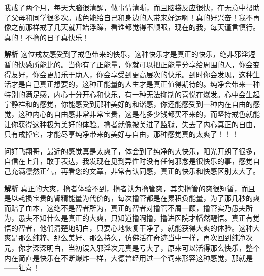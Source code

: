 \begin{case}
    我戒了两个月，每天大脑很清醒，做事情清晰，而且脑袋反应很快，在无意中帮助了父母和同学很多次。戒色能给自己和身边的人带来好运啊！真的好兴奋！我不再像之前那样戒了几天就开始浮躁，看谁都觉得不顺眼，现在的我，每天谨言慎行。真的！不撸的日子真快乐！

    \textbf{解析} 这位戒友感受到了戒色带来的快乐，这种快乐才是真正的快乐，绝非邪淫短暂的快感所能比的。当你有了正能量，你就可以把正能量分享给周围的人，你会变得友好，你会更加乐于助人，你会享受到更高层次的快乐。到时你会发现，这种生活才是自己真正想要的，这种正能量的人生才是真正值得期待的。纯净会带来一种特别的满足感，内心十分开心和快乐，有一种无法抑制的喜悦在爆发。心中会生起宁静祥和的感觉，你能感受到那种美好的和谐感，你还能感受到一种内在自由的感觉，这种内心的自由感非常非常宝贵，这是花多少钱都买不来的，而坚持戒色就能让你获得这种极为美好的体验。撸者就像被关进了监狱，失去了内心真正的自由，只有戒掉它，才能尽享纯净带来的美好与自由，那种感觉真的太爽了！！！
\end{case}

\begin{case}
    问好飞翔哥，最近的感觉真是太爽了，体会到了纯净的大快乐，阳光开朗了很多，自信在上升，敢于表达，我发现在见到异性时没有任何邪念是很快乐的事，感觉自己充满凛然正气，再看您的文章，非常有认同感，真正的快乐和快感区别太大了。

    \textbf{解析} 真正的大爽，撸者体验不到，撸者认为撸管爽，其实撸管的爽很短暂，而且是以耗损宝贵的肾精能量为代价的，每次撸管都是在累积负能量，为了那几秒的爽而赔了血本，这绝不是智者所为，真正的智者对撸管不屑一顾，撸管实乃愚夫所为，愚夫不知什么是真正的大爽，只知道撸啊撸，撸进医院才幡然醒悟。真正有觉悟的智者，他们清楚地明白，只要心地恢复干净了，就能获得大爽的体验。这种大爽是那么纯粹、那么美好、那么持久，仿佛活在奇迹当中一样，再次回到纯净次元，你才深深明白，当初误入邪淫次元真是亏大了，原来可以活得那么快乐，整个内在简直是快乐在不断爆炸一样，大德曾经用过一个词来形容这种感觉，那就是——狂喜！
\end{case}

